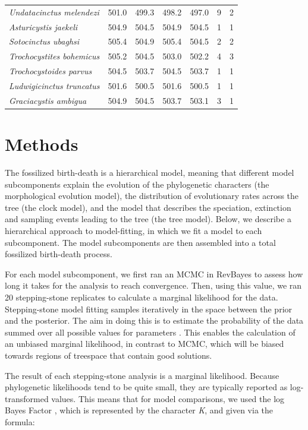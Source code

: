 \documentclass{article}
\begin{document}
\begin{table}[]
\begin{tabular}{l|llIIlI}
\textit{Undatacinctus melendezi} & 501.0 & 499.3 & 498.2 & 497.0 & 9 & 2\\
\textit{Asturicystis jaekeli} & 504.9 & 504.5 & 504.9 & 504.5 & 1 & 1\\
\textit{Sotocinctus ubaghsi} & 505.4 & 504.9 & 505.4 & 504.5 & 2 & 2\\
\textit{Trochocystites bohemicus} & 505.2 & 504.5 & 503.0 & 502.2 & 4 & 3\\
\textit{Trochocystoides parvus} & 504.5 & 503.7 & 504.5 & 503.7 & 1 & 1\\
\textit{Ludwigicinctus truncatus} & 501.6 & 500.5 & 501.6 & 500.5 & 1 & 1\\
\textit{Graciacystis ambigua} & 504.9 & 504.5 & 503.7 & 503.1 & 3 & 1 
\end{tabular}
\end{table}


\section{Methods}

The fossilized birth-death is a hierarchical model, meaning that different model subcomponents explain the evolution of the phylogenetic characters (the morphological evolution model), the distribution of evolutionary rates across the tree (the clock model), and the model that describes the speciation, extinction and sampling events leading to the tree (the tree model). 
Below, we describe a hierarchical approach to model-fitting, in which we fit a model to each subcomponent.
The model subcomponents are then assembled into a total fossilized birth-death process.

For each model subcomponent, we first ran an MCMC in RevBayes to assess how long it takes for the analysis to reach convergence. 
Then, using this value, we ran 20 stepping-stone replicates to calculate a marginal likelihood for the data.
Stepping-stone model fitting samples iteratively in the space between the prior and the posterior.
The aim in doing this is to estimate the probability of the data summed over all possible values for parameters  \citep{Xie2011}. 
This enables the calculation of an unbiased marginal likelihood, in contrast to MCMC, which will be biased towards regions of treespace that contain good solutions. 

The result of each stepping-stone analysis is a marginal likelihood.
Because phylogenetic likelihoods tend to be quite small, they are typically reported as log-transformed values.
This means that for model comparisons, we used the log Bayes Factor \citep{Kass1995}, which is represented by the character \textit{K}, and given via the formula:
\end{document}
